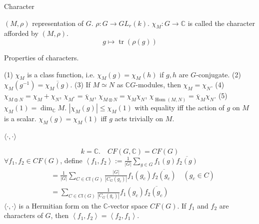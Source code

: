 \documentclass[11pt, a4paper]{report}
\begin{document}
\begin{definition}
Character

$(M, \rho)$ representation of $G$. $\rho: G \rightarrow GL_{r}(k)$.
$\chi_{M}: G \rightarrow \mathbb{C}$ is called the character afforded by $(M, \rho)$.
\[
g \mapsto \operatorname{tr}(\rho(g))
\]
\end{definition}

\begin{proposition}
Properties of characters.

(1) $\chi_{M}$ is a class function, i.e. $\chi_{M}(g)=\chi_{M}(h)$ if $g, h$ are $G$-conjugate.
(2) $\chi_{M}\left(g^{-1}\right)=\overline{\chi_{M}(g)}$.
(3) If $M \simeq N$ as $\mathbb{C}G$-modules, then $\chi_{M}=\chi_{N}$.
(4) $\chi_{M \oplus N}=\chi_{M} + \chi_{N}$, $\chi_{M^{*}}=\overline{\chi}_{M}$, $\chi_{M \otimes N}=\chi_{M} \chi_{N}$, $\chi_{\operatorname{Hom}(M, N)}=\overline{\chi}_{M} \chi_{N}$.
(5) $\chi_{M}(1)=\operatorname{dim}_{\mathbb{C}} M$.
$\left|\chi_{M}(g)\right| \leq \chi_{M}(1)$ with equality iff the action of $g$ on $M$ is a scalar.
$\chi_{M}(g)=\chi_{M}(1)$ iff $g$ acts trivially on $M$.

\end{proposition}

\begin{definition}
$\langle \cdot, \cdot \rangle$

\[
k=\mathbb{C}. \quad CF(G, \mathbb{C})=CF(G)
\]
$\forall f_{1}, f_{2} \in CF(G)$, define $\left\langle f_{1}, f_{2}\right\rangle:=\frac{1}{|G|} \sum_{g \in G} f_{1}(g) \overline{f_{2}(g)}$
\[
\begin{aligned}
& =\frac{1}{|G|} \sum_{C \in Cl(G)} \frac{|G|}{\left|C_{G}(g_{c})\right|} f_{1}\left(g_{c}\right) \overline{f_{2}\left(g_{c}\right)} \quad\left(g_{c} \in C\right) \\
& =\sum_{C \in Cl(G)} \frac{1}{\left|C_{G}\left(g_{c}\right)\right|} f_{1}\left(g_{c}\right) \overline{f_{2}\left(g_{c}\right)}
\end{aligned}
\]
$\langle \cdot, \cdot \rangle$ is a Hermitian form on the $\mathbb{C}$-vector space $CF(G)$.
If $f_{1}$ and $f_{2}$ are characters of $G$, then $\left\langle f_{1}, f_{2}\right\rangle=\left\langle f_{2}, f_{1}\right\rangle$.
\end{definition}
\end{document}

